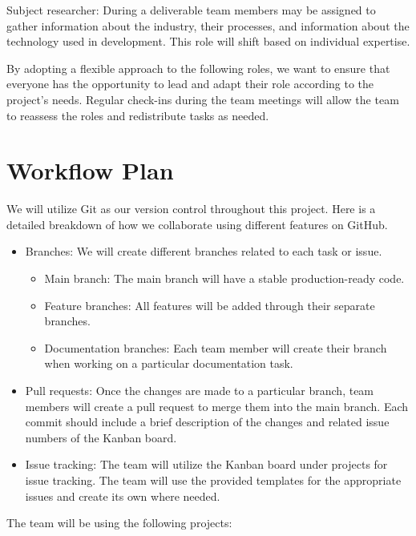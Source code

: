 \documentclass{article}
\begin{document}
Subject researcher: During a deliverable team members may be assigned to gather information about the industry, their processes, and information about the technology used in development. This role will shift based on individual expertise.

By adopting a flexible approach to the following roles, we want to ensure that everyone has the opportunity to lead and adapt their role according to the project’s needs. Regular check-ins during the team meetings will allow the team to reassess the roles and redistribute tasks as needed. 


\section{Workflow Plan}

We will utilize Git as our version control throughout this project. Here is a detailed breakdown of how we collaborate using different features on GitHub. 

\begin{itemize}
\item Branches: We will create different branches related to each task or issue. 
\begin{itemize}
\item Main branch: The main branch will have a stable production-ready code. 
\item Feature branches: All features will be added through their separate branches.
\item Documentation branches: Each team member will create their branch when working on a particular documentation task. 
\end{itemize}

\item Pull requests: Once the changes are made to a particular branch, team members will create a pull request to merge them into the main branch. Each commit should include a brief description of the changes and related issue numbers of the Kanban board.

\item Issue tracking: The team will utilize the Kanban board under projects for issue tracking. The team will use the provided templates for the appropriate issues and create its own where needed. 
\end{itemize}

The team will be using the following projects:
\end{document}
